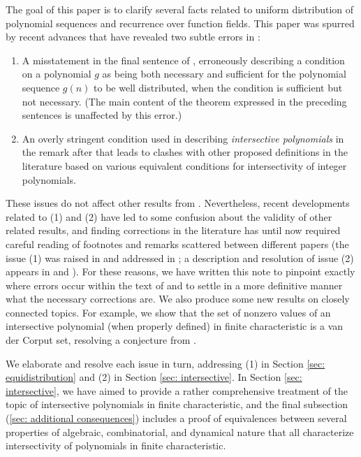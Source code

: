 \documentclass[11pt]{amsart}
\theoremstyle{theorem}
\theoremstyle{definition}
\begin{document}
The goal of this paper is to clarify several facts related to uniform distribution of polynomial sequences and recurrence over function fields.
This paper was spurred by recent advances that have revealed two subtle errors in \cite{bl}:
\begin{enumerate}[(1)]
	\item	A misstatement in the final sentence of \cite[Theorem 0.3]{bl}, erroneously describing a condition on a polynomial $g$ as being both necessary and sufficient for the polynomial sequence $g(n)$ to be well distributed, when the condition is sufficient but not necessary. (The main content of the theorem expressed in the preceding sentences is unaffected by this error.)
	\item	An overly stringent condition used in describing \emph{intersective polynomials} in the remark after \cite[Theorem 9.5]{bl} that leads to clashes with other proposed definitions in the literature based on various equivalent conditions for intersectivity of integer polynomials.
\end{enumerate}
These issues do not affect other results from \cite{bl}.
Nevertheless, recent developments related to (1) and (2) have led to some confusion about the validity of other related results, and finding corrections in the literature has until now required careful reading of footnotes and remarks scattered between different papers (the issue (1) was raised in \cite{cgllw} and addressed in \cite[Remark 2.2]{a}; a description and resolution of issue (2) appears in \cite[p. 3, footnote 3]{ab_fields} and \cite[Remark 4.15]{ab_rings}).
For these reasons, we have written this note to pinpoint exactly where errors occur within the text of \cite{bl} and to settle in a more definitive manner what the necessary corrections are.
We also produce some new results on closely connected topics.
For example, we show that the set of nonzero values of an intersective polynomial (when properly defined) in finite characteristic is a van der Corput set, resolving a conjecture from \cite{llw}.

We elaborate and resolve each issue in turn, addressing (1) in Section \ref{sec: equidistribution} and (2) in Section \ref{sec: intersective}.
In Section \ref{sec: intersective}, we have aimed to provide a rather comprehensive treatment of the topic of intersective polynomials in finite characteristic, and the final subsection (\ref{sec: additional consequences}) includes a proof of equivalences between several properties of algebraic, combinatorial, and dynamical nature that all characterize intersectivity of polynomials in finite characteristic.
\end{document}
